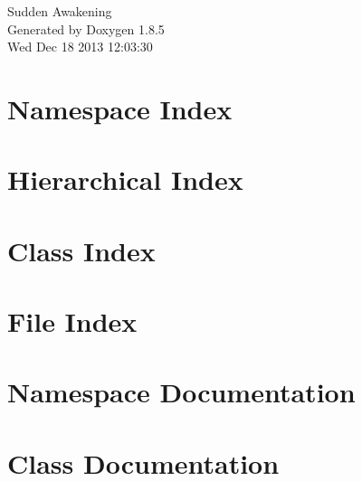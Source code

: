 \documentclass[twoside]{book}
\newcommand{\clearemptydoublepage}{%
  \newpage{\pagestyle{empty}\cleardoublepage}%
}
\begin{document}
\hypersetup{pageanchor=false}
\begin{titlepage}
\vspace*{7cm}
\begin{center}%
{\Large Sudden Awakening }\\
\vspace*{1cm}
{\large Generated by Doxygen 1.8.5}\\
\vspace*{0.5cm}
{\small Wed Dec 18 2013 12:03:30}\\
\end{center}
\end{titlepage}
\clearemptydoublepage
\tableofcontents
\clearemptydoublepage
{}
\hypersetup{pageanchor=true}

\chapter{Namespace Index}

\chapter{Hierarchical Index}

\chapter{Class Index}

\chapter{File Index}

\chapter{Namespace Documentation}



\chapter{Class Documentation}





































\end{document}
